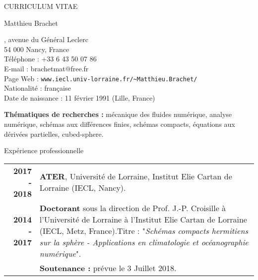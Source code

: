 \documentclass[10pt,a4paper]{report}
\def\cvpart{\noindent \hrulefill}
\def\sp{\vspace{6mm}}
\begin{document}
\begin{center}
{\selectfont
\begin{LARGE}
CURRICULUM VITAE
\end{LARGE}

\begin{large}
Matthieu Brachet
\end{large}

\hrulefill
}
\end{center}

, avenue du Général Leclerc\\
54 000 Nancy, France
\vspace{0.2cm}\\
Téléphone : +33 6 43 50 07 86\\
E-mail : brachetmat@free.fr\\
Page Web : \verb?www.iecl.univ-lorraine.fr/~Matthieu.Brachet/?
\vspace{0.2cm}\\
Nationalité : française\\
Date de naissance : 11 février 1991 (Lille, France)

\cvpart

\noindent
\textbf{Thématiques de recherches : } mécanique des fluides numérique, analyse numérique, schémas aux différences finies, schémas compacts, équations aux dérivées partielles, cubed-sphere.







\sp
{\selectfont
\begin{Large}
Expérience professionnelle
\end{Large}
\cvpart
}
\sp

\begin{center}
\begin{tabular}{r p{12cm}}
\textbf{2017 - 2018} & \textbf{ATER}, Université de Lorraine, Institut Elie Cartan de Lorraine (IECL, Nancy). \vspace{2mm}\\

\textbf{2014 - 2017} & \textbf{Doctorant} sous la direction de Prof. J.-P. Croisille à l'Université de Lorraine à l'Institut Elie Cartan de Lorraine (IECL, Metz, France).\newline Titre : "\textit{Schémas compacts hermitiens sur la sphère - Applications en climatologie et océanographie numérique}".\vspace{2mm}\\
	
	& \textbf{Soutenance :} prévue le 3 Juillet 2018.\\
\end{tabular}
\end{center}
\end{document}
